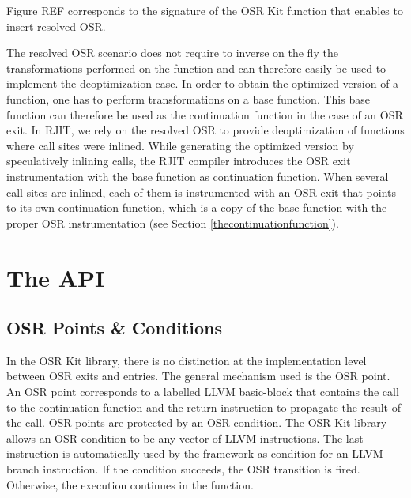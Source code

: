 Figure REF corresponds to the signature of the OSR Kit function that enables to insert resolved OSR.\\

\begin{minipage}{\linewidth}
\end{minipage}

The resolved OSR scenario does not require to inverse on the fly the transformations performed on the function and can therefore easily be used to implement the deoptimization case.
In order to obtain the optimized version of a function, one has to perform transformations on a base function.
This base function can therefore be used as the continuation function in the case of an OSR exit.
In RJIT, we rely on the resolved OSR to provide deoptimization of functions where call sites were inlined.
While generating the optimized version by speculatively inlining calls, the RJIT compiler introduces the OSR exit instrumentation with the base function as continuation function.
When several call sites are inlined, each of them is instrumented with an OSR exit that points to its own continuation function, which is a copy of the base function with the proper OSR instrumentation (see Section \ref{thecontinuationfunction}).\\



\section{The API}
\subsection{OSR Points \& Conditions}

In the OSR Kit library\cite{OSRKit}, there is no distinction at the implementation level between OSR exits and entries.
The general mechanism used is the OSR point.
An OSR point corresponds to a labelled LLVM basic-block that contains the call to the continuation function and the return instruction to propagate the result of the call.
OSR points are protected by an OSR condition. 
The OSR Kit library allows an OSR condition to be any vector of LLVM instructions. 
The last instruction is automatically used by the framework as condition for an LLVM branch instruction. 
If the condition succeeds, the OSR transition is fired.
Otherwise, the execution continues in the function.\\

